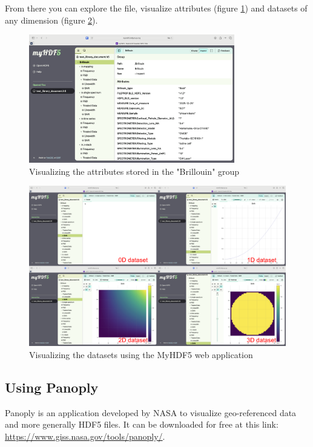 \documentclass{article}
\begin{document}
From there you can explore the file, visualize attributes (figure \ref{fig:my_hdf5_attributes}) and datasets of any dimension (figure \ref{fig:my_hdf5_datasets}).

\begin{figure}[H]
    \centering
    \includegraphics[width=0.8\textwidth]{img/My_HDF5_attributes.png}
    \caption{Visualizing the attributes stored in the "Brillouin" group} 
    \label{fig:my_hdf5_attributes}
\end{figure}

\begin{figure}[H]
    \centering
    \includegraphics[width=\textwidth]{img/MyHDF5_visualizer.png}
    \caption{Visualizing the datasets using the MyHDF5 web application} 
    \label{fig:my_hdf5_datasets}
\end{figure}

\subsection{Using Panoply}

Panoply is an application developed by NASA to visualize geo-referenced data and more generally HDF5 files. It can be downloaded for free at this link: \url{https://www.giss.nasa.gov/tools/panoply/}. 
\end{document}
